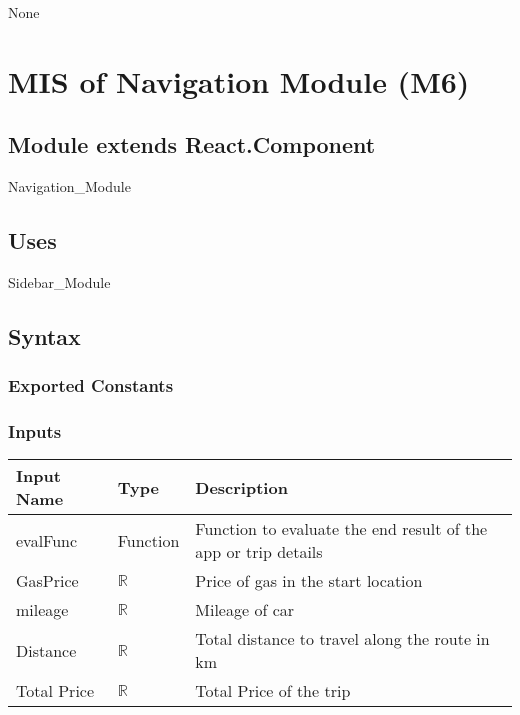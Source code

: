 \documentclass[12pt, titlepage]{article}
\begin{document}
None

\newpage



\section{MIS of Navigation Module (M6)} 

\label{Module} 

\subsection{Module extends React.Component}

Navigation\_Module

\subsection{Uses}

Sidebar\_Module

\subsection{Syntax}

\subsubsection{Exported Constants}

\subsubsection{Inputs}
\begin{tabular}{| l | l | l |}
  \hline
  \textbf{Input Name} & \textbf{Type} & \textbf{Description}\\
  \hline
  evalFunc & Function & Function to evaluate the end result of the app or trip details \\
  \hline
  GasPrice & $\mathbb{R}$ & Price of gas in the start location \\
  \hline
  mileage & $\mathbb{R}$ & Mileage of car \\
  \hline
  Distance & $\mathbb{R}$  & Total distance to travel along the route in km \\
  \hline
  Total Price & $\mathbb{R}$ & Total Price of the trip \\
  \hline
\end{tabular}
\end{document}
